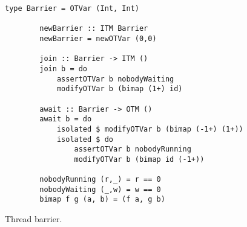 \begin{figure}
    \centering
    \begin{Verbatim}[tabsize=3, gobble=2]
        type Barrier = OTVar (Int, Int)

        newBarrier :: ITM Barrier
        newBarrier = newOTVar (0,0)    
    
        join :: Barrier -> ITM ()
        join b = do
            assertOTVar b nobodyWaiting
            modifyOTVar b (bimap (1+) id)
            
        await :: Barrier -> OTM ()
        await b = do
            isolated $ modifyOTVar b (bimap (-1+) (1+))
            isolated $ do
                assertOTVar b nobodyRunning
                modifyOTVar b (bimap id (-1+))
        
        nobodyRunning (r,_) = r == 0
        nobodyWaiting (_,w) = w == 0
        bimap f g (a, b) = (f a, g b)
    \end{Verbatim}
%
%    
%            
%        
%
%            
%            
    \caption{Thread barrier.}
    \label{fig:example-barrier}
\end{figure}

